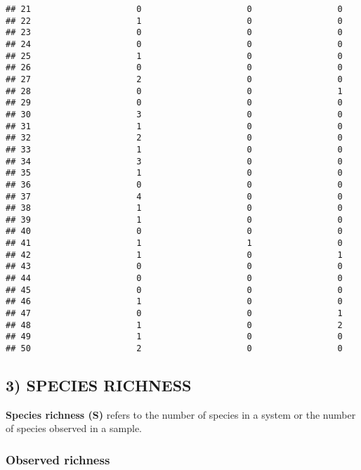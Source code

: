 \documentclass[
]{article}
\begin{document}
\begin{verbatim}
## 21                     0                     0                 0
## 22                     1                     0                 0
## 23                     0                     0                 0
## 24                     0                     0                 0
## 25                     1                     0                 0
## 26                     0                     0                 0
## 27                     2                     0                 0
## 28                     0                     0                 1
## 29                     0                     0                 0
## 30                     3                     0                 0
## 31                     1                     0                 0
## 32                     2                     0                 0
## 33                     1                     0                 0
## 34                     3                     0                 0
## 35                     1                     0                 0
## 36                     0                     0                 0
## 37                     4                     0                 0
## 38                     1                     0                 0
## 39                     1                     0                 0
## 40                     0                     0                 0
## 41                     1                     1                 0
## 42                     1                     0                 1
## 43                     0                     0                 0
## 44                     0                     0                 0
## 45                     0                     0                 0
## 46                     1                     0                 0
## 47                     0                     0                 1
## 48                     1                     0                 2
## 49                     1                     0                 0
## 50                     2                     0                 0
\end{verbatim}

\hypertarget{species-richness}{%
\subsection{3) SPECIES RICHNESS}\label{species-richness}}

\textbf{Species richness (S)} refers to the number of species in a
system or the number of species observed in a sample.

\hypertarget{observed-richness}{%
\subsubsection{Observed richness}\label{observed-richness}}
\end{document}
